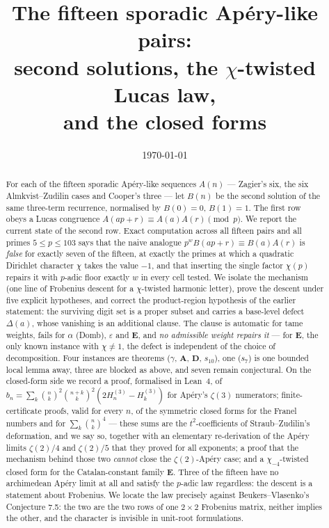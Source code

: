 \documentclass[11pt,reqno]{amsart}
\theoremstyle{plain}
\theoremstyle{definition}
\theoremstyle{remark}
\newcommand{\bin}[2]{\binom{#1}{#2}}
\newcommand{\HH}[2]{H^{(#1)}_{#2}}
\numberwithin{equation}{section}
\begin{document}
\title[The fifteen sporadic Ap\'ery-like pairs]
      {The fifteen sporadic Ap\'ery-like pairs:\\
       second solutions, the $\chi$-twisted Lucas law,\\ and the closed forms}

\author{}
\date{\today}


\begin{abstract}
For each of the fifteen sporadic Ap\'ery-like sequences $A(n)$ --- Zagier's six, the six
Almkvist--Zudilin cases and Cooper's three --- let $B(n)$ be the second solution of the
same three-term recurrence, normalised by $B(0)=0$, $B(1)=1$. The first row obeys a Lucas
congruence $A(ap+r)\equiv A(a)A(r)\pmod p$. We report the current state of the second row.
Exact computation across all fifteen pairs and all primes $5\le p\le 103$ says that the
naive analogue $p^{w}B(ap+r)\equiv B(a)A(r)$ is \emph{false} for exactly seven of the
fifteen, at exactly the primes at which a quadratic Dirichlet character $\chi$ takes the
value $-1$, and that inserting the single factor $\chi(p)$ repairs it with $p$-adic floor
exactly $w$ in every cell tested. We isolate the mechanism (one line of Frobenius descent
for a $\chi$-twisted harmonic letter), prove the descent under five explicit hypotheses,
and correct the product-region hypothesis of the earlier statement: the surviving digit set
is a proper subset and carries a base-level defect $\Delta(a)$, whose vanishing is an
additional clause. The clause is automatic for tame weights, fails for $\alpha$
(Domb), $\varepsilon$ and $\mathbf E$, and \emph{no admissible weight repairs it} --- for
$\mathbf E$, the only known instance with $\chi\ne1$, the defect is independent of the
choice of decomposition. Four instances are theorems ($\gamma$, $\mathbf A$, $\mathbf D$,
$s_{10}$), one ($s_7$) is one bounded local lemma away, three are blocked as above, and
seven remain conjectural. On the closed-form side we record a proof, formalised in Lean~4,
of $b_n=\sum_k\bin nk^2\bin{n+k}k^2(2\HH3n-\HH3k)$ for Ap\'ery's $\zeta(3)$ numerators;
finite-certificate proofs, valid for every $n$, of the symmetric closed forms for the Franel
numbers and for $\sum_k\bin nk^4$ --- these sums are the $t^2$-coefficients of
Straub--Zudilin's deformation, and we say so, together with an elementary re-derivation of
the Ap\'ery limits $\zeta(2)/4$ and $\zeta(2)/5$ that they proved for all exponents; a proof
that the mechanism behind those two \emph{cannot} close the $\zeta(2)$-Ap\'ery case; and a
$\chi_{-4}$-twisted closed form for the Catalan-constant family $\mathbf E$. Three of the fifteen have no archimedean
Ap\'ery limit at all and satisfy the $p$-adic law regardless: the descent is a statement
about Frobenius. We locate the law precisely against Beukers--Vlasenko's Conjecture 7.5:
the two are the two rows of one $2\times2$ Frobenius matrix, neither implies the other, and
the character is invisible in unit-root formulations.
\end{abstract}
\end{document}
